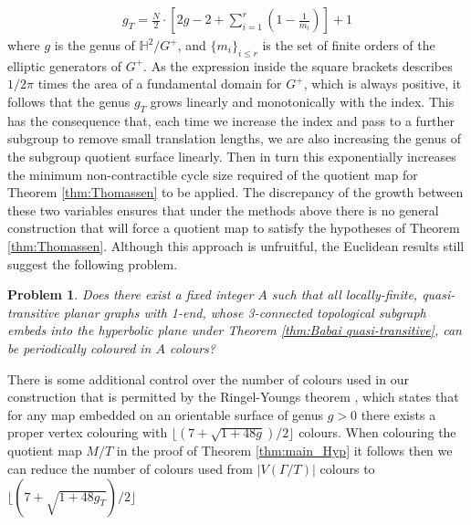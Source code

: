 \documentclass{article}
\numberwithin{equation}{section}
\newcommand{\HH}{\mathbb{H}}
\newtheorem{problem}{Problem}[section]
\theoremstyle{definition}
\theoremstyle{remark}
\begin{document}
\begin{align}\label{eq:g_t}
    g_T=\frac{N}{2}\cdot\left[2g-2+\sum_{i=1}^r\left( 1-\frac{1}{m_i}\right)\right]+1
\end{align}
where $g$ is the genus of $\HH^2/G^+$, and $\{m_i\}_{i\leq r}$ is the set of finite orders of the elliptic generators of $G^+$.
As the expression inside the square brackets describes $1/2\pi$ times the area of a fundamental domain for $G^+$, which is always positive, it follows that the genus $g_T$ grows linearly and monotonically with the index.
This has the consequence that, each time we increase the index and pass to a further subgroup to remove small translation lengths, we are also increasing the genus of the subgroup quotient surface linearly. Then in turn this exponentially increases the minimum non-contractible cycle size required of the quotient map for Theorem \ref{thm:Thomassen} to be applied. The discrepancy of the growth between these two variables ensures that under the methods above there is no general construction that will force a quotient map to satisfy the hypotheses of Theorem \ref{thm:Thomassen}.  
Although this approach is unfruitful, the Euclidean results still suggest the following problem. 
\begin{problem}
    Does there exist a fixed integer $A$ such that all locally-finite, quasi-transitive planar graphs with 1-end, whose 3-connected topological subgraph embeds into the hyperbolic plane under Theorem \ref{thm:Babai quasi-transitive}, can be periodically coloured in $A$ colours?
\end{problem}
There is some additional control over the number of colours used in our construction that is permitted by the Ringel-Youngs theorem \cite{RingelYoungs68}, which states that for any map embedded on an orientable surface of genus $g>0$ there exists a proper vertex colouring with $\lfloor (7+\sqrt{1+48g})/2\rfloor$ colours. When colouring the quotient map $M/T$ in the proof of Theorem \ref{thm:main_Hyp} it follows then we can reduce the number of colours used from $|V(\Gamma/T)|$ colours to $\lfloor( 7+\sqrt{1+48g_T})/2\rfloor$
\end{document}
